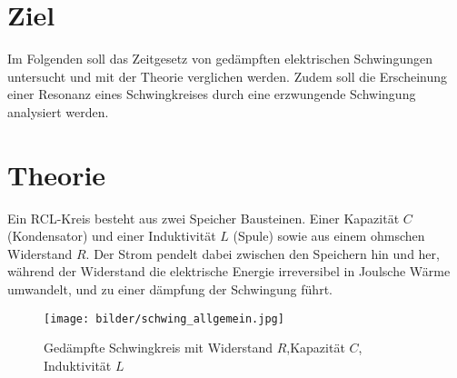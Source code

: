 \newpage

\section{Ziel}
Im Folgenden soll das Zeitgesetz von gedämpften elektrischen Schwingungen untersucht und mit
der Theorie verglichen werden.
Zudem soll die Erscheinung einer Resonanz eines Schwingkreises 
durch eine erzwungende Schwingung analysiert werden.

\section{Theorie}
Ein RCL-Kreis besteht aus zwei Speicher Bausteinen. Einer Kapazität $C$ (Kondensator)
und einer Induktivität $L$ (Spule) sowie aus einem ohmschen Widerstand $R$.
Der Strom pendelt dabei zwischen den Speichern hin und her, während der Widerstand die 
elektrische Energie irreversibel in Joulsche Wärme umwandelt, und zu einer dämpfung der
Schwingung führt.

\begin{figure}
    \centering
    \texttt{[image: bilder/schwing\_allgemein.jpg]}
    \label{fig:schwing_allgemein}
    \caption{Gedämpfte Schwingkreis mit Widerstand $R$,Kapazität $C$, Induktivität $L$ \cite[284]{Anleitung}}
\end{figure}

